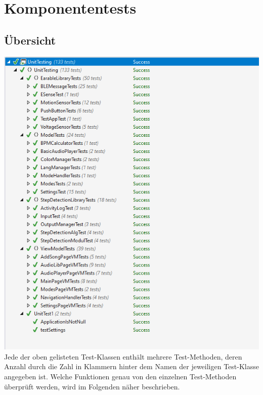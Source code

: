 \documentclass[../validierung.tex]{subfiles}
\begin{document}
\section{Komponententests}
	\subsection{Übersicht}
	\includegraphics[width=\textwidth]{alleok.png}
	Jede der oben gelisteten Test-Klassen enthält mehrere Test-Methoden, deren Anzahl durch die Zahl in Klammern hinter dem Namen der jeweiligen Test-Klasse angegeben ist. Welche Funktionen genau von den einzelnen Test-Methoden überprüft werden, wird im Folgenden näher beschrieben.
\end{document}
